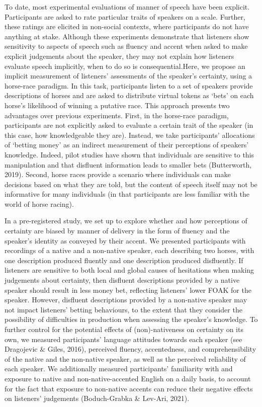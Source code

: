\documentclass[
  man,floatsintext]{apa7}
\begin{document}
To date, most experimental evaluations of manner of speech have been explicit. Participants are asked to rate particular traits of speakers on a scale. Further, these ratings are elicited in non-social contexts, where participants do not have anything at stake. Although these experiments demonstrate that listeners show sensitivity to aspects of speech such as fluency and accent when asked to make explicit judgements about the speaker, they may not explain how listeners evaluate speech implicitly, when to do so is consequential.Here, we propose an implicit measurement of listeners' assessments of the speaker's certainty, using a horse-race paradigm. In this task, participants listen to a set of speakers provide descriptions of horses and are asked to distribute virtual tokens as `bets' on each horse's likelihood of winning a putative race. This approach presents two advantages over previous experiments. First, in the horse-race paradigm, participants are not explicitly asked to evaluate a certain trait of the speaker (in this case, how knowledgeable they are). Instead, we take participants' allocations of `betting money' as an indirect measurement of their perceptions of speakers' knowledge. Indeed, pilot studies have shown that individuals are sensitive to this manipulation and that disfluent information leads to smaller bets (Butterworth, 2019). Second, horse races provide a scenario where individuals can make decisions based on what they are told, but the content of speech itself may not be informative for many individuals (in that participants are less familiar with the world of horse racing).

In a pre-registered study, we set up to explore whether and how perceptions of certainty are biased by manner of delivery in the form of fluency and the speaker's identity as conveyed by their accent. We presented participants with recordings of a native and a non-native speaker, each describing two horses, with one description produced fluently and one description produced disfluently. If listeners are sensitive to both local and global causes of hesitations when making judgements about certainty, then disfluent descriptions provided by a native speaker should result in less money bet, reflecting listeners' lower FOAK for the speaker. However, disfluent descriptions provided by a non-native speaker may not impact listeners' betting behaviours, to the extent that they consider the possibility of difficulties in production when assessing the speaker's knowledge. To further control for the potential effects of (non)-nativeness on certainty on its own, we measured participants' language attitudes towards each speaker (see Dragojevic \& Giles, 2016), perceived fluency, accentedness, and comprehensibility of the native and the non-native speaker, as well as the perceived reliability of each speaker. We additionally measured participants' familiarity with and exposure to native and non-native-accented English on a daily basis, to account for the fact that exposure to non-native accents can reduce their negative effects on listeners' judgements (Boduch-Grabka \& Lev-Ari, 2021).
\end{document}
